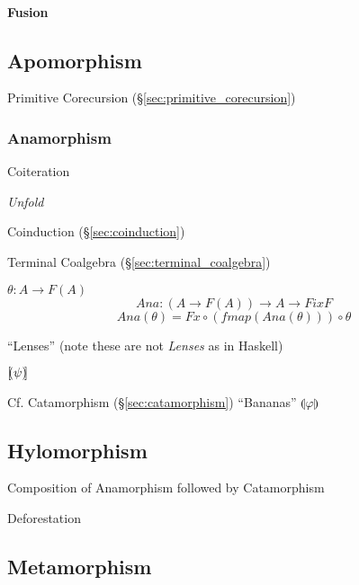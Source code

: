 \paragraph{Fusion}\label{sec:fusion}\hfill



\subsection{Apomorphism}\label{sec:apomorphism}

Primitive Corecursion (\S\ref{sec:primitive_corecursion})



\subsubsection{Anamorphism}\label{sec:anamorphism}

Coiteration

\emph{Unfold}

Coinduction (\S\ref{sec:coinduction})

Terminal Coalgebra (\S\ref{sec:terminal_coalgebra})

$\theta : A \rightarrow F(A)$
\[
  Ana : (A \rightarrow F (A)) \rightarrow A \rightarrow Fix F
\]\[
  Ana (\theta) = Fx \circ (fmap (Ana (\theta))) \circ \theta
\]

``Lenses'' (note these are not \emph{Lenses} as in Haskell)

$[\kern-1.95pt( \psi )\kern-2.0pt]$

\fist Cf. Catamorphism (\S\ref{sec:catamorphism}) ``Bananas''
$\llparenthesis \varphi \rrparenthesis$



\subsection{Hylomorphism}\label{sec:hylomorphism}

Composition of Anamorphism followed by Catamorphism

Deforestation



\subsection{Metamorphism}\label{sec:metamorphism}

